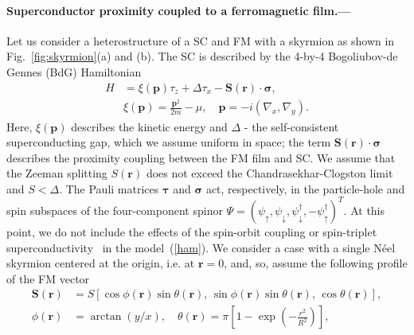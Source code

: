 \documentclass[twocolumn,showpacs,floatfix,longbibliography]{revtex4-1}
\begin{document}
\paragraph*{Superconductor proximity coupled to a ferromagnetic film.--- }  \label{sec:model}
Let us consider a heterostructure of a SC and FM with a skyrmion as shown in Fig.~\ref{fig:skyrmion}(a) and (b). The SC is described by the 4-by-4 Bogoliubov-de Gennes (BdG) Hamiltonian
\begin{align}
 H &= \xi(\bm p)\tau_z+\Delta \tau_x - \bm S(\bm r)\cdot\bm\sigma, \label{ham} \\
   & \xi(\bm p) = \frac{\bm p^2}{2m}-\mu,\quad \bm p = -i(\nabla_x,\nabla_y).
\end{align}
Here, $\xi(\bm p)$ describes the kinetic energy and $\Delta$ - the self-consistent superconducting gap, which we assume uniform in space; the term $\bm S(\bm r)\cdot\bm\sigma$ describes the proximity coupling between the FM film and SC. We assume that the Zeeman splitting $S(\bm r)$ does not exceed the Chandrasekhar-Clogston limit and $S<\Delta$. The Pauli matrices $\bm \tau$ and $\bm \sigma$ act, respectively, in the particle-hole and spin subspaces of the four-component spinor $\Psi = (\psi_\uparrow,\psi_\downarrow,\psi^\dagger_\downarrow,-\psi^\dagger_\uparrow)^T$. At this point, we do not include the effects of the spin-orbit coupling or spin-triplet superconductivity~\cite{Note1} in the model~(\ref{ham}). We consider a case with a single N\'eel skyrmion centered at the origin, i.e. at $\bm r = 0$, and, so, assume the following profile of the FM vector
\begin{align}
	\bm S(\bm r) &= S\left[ \cos\phi(\bm r) \sin\theta(\bm r),\, \sin\phi(\bm r)\sin\theta(\bm r),\,\cos\theta(\bm r)\right],\nonumber  \\
	\phi(\bm r) &= \arctan(y/x),\quad \theta(\bm r) = \pi \left[ 1-\exp\left( -\frac{r^2}{R^2} \right) \right], \label{conf}
\end{align}
\end{document}
